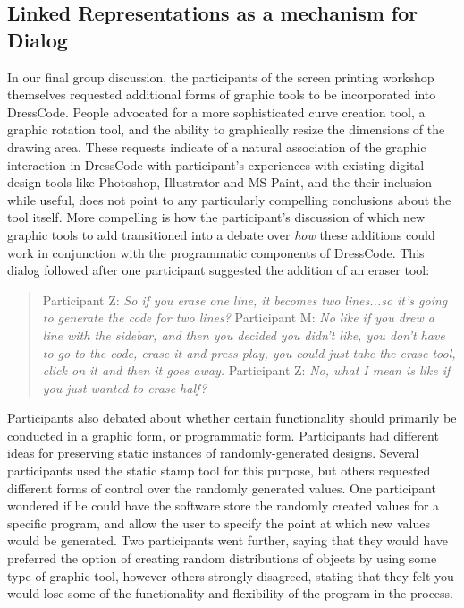 \documentclass{sigchi}
\begin{document}
\subsection{Linked Representations as a mechanism for Dialog}
In our final group discussion, the participants of the screen printing workshop themselves requested additional forms of graphic tools to be incorporated into DressCode. People advocated for a more sophisticated curve creation tool, a graphic rotation tool, and the ability to graphically resize the dimensions of the drawing area. These requests indicate of a natural association of the graphic interaction in DressCode with participant's experiences with existing digital design tools like Photoshop, Illustrator and MS Paint, and the their inclusion while useful, does not point to any particularly compelling conclusions about the tool itself. More compelling is how the participant's discussion of which new graphic tools to add transitioned into a debate over \textit{how} these additions could work in conjunction with the programmatic components of DressCode. This dialog followed after one participant suggested the addition of an eraser tool:

\begin{quotation}
Participant Z: \textit{So if you erase one line, it becomes two lines...so it's going to generate the code for two lines?}
Participant M: \textit{No like if you drew a line with the sidebar, and then you decided you didn't like, you don't have to go to the code, erase it and press play, you could just take the erase tool, click on it and then it goes away.}
Participant Z:  \textit{No, what I mean is like if you just wanted to erase half?}
\end{quotation}

Participants also debated about whether certain functionality should primarily be conducted in a graphic form, or programmatic form. Participants had different ideas for preserving static instances of randomly-generated designs. Several participants used the static stamp tool for this purpose, but others requested different forms of control over the randomly generated values. One participant wondered if he could have the software store the randomly created values for a specific program, and allow the user to specify the point at which new values would be generated. Two participants went further, saying that they would have preferred the option of creating random distributions of objects by using some type of graphic tool, however others strongly disagreed, stating that they felt you would lose some of the functionality and flexibility  of the program in the process.
\end{document}
